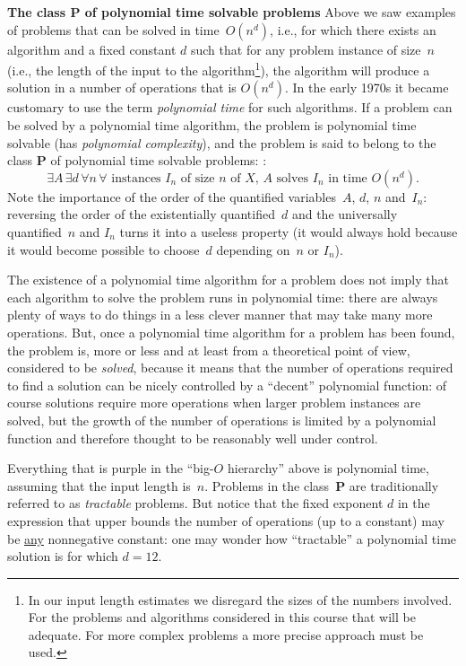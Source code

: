 \documentclass[titlepage]{article}
\theoremstyle{definition}
\numberwithin{equation}{subsection}
\numberwithin{remark}{subsection}
\begin{document}
\par\noindent
{\bf{The class {\bf P} of polynomial time solvable problems}}
Above we saw examples of problems that can be solved in time~$O(n^d)$, i.e., for which there exists an algorithm and a fixed constant $d$ such that for any problem instance of size~$n$ (i.e., the length of the input to the algorithm\footnote{In our input length estimates we disregard the sizes of the numbers involved. For the problems and algorithms considered in this course that will be adequate. For more complex problems a more precise approach must be used.}), the algorithm will produce a solution in a number of operations that is $O(n^d)$.
In the early 1970s it became customary to use the term \emph{polynomial time} for such algorithms.
If a problem can be solved by a polynomial time algorithm, the problem is polynomial time solvable (has \emph{polynomial complexity}), and the problem is said to belong to the class {\bf P} of polynomial time solvable problems:
{\color{red}{a problem~$X$ can be solved in polynomial time if there is an algorithm~$A$ and a fixed constant $d$ such that for all $n$ any instance of size~$n$ of problem~$X$ can be solved by~$A$ in $O(n^d)$ operations}}:
$$\exists A\,\exists d\,\forall n\,\forall {\text{ instances $I_n$ of size $n$ of $X$, $A$ solves $I_n$ in time $O(n^d)$}}. $$
Note the importance of the order of the quantified variables~$A$, $d$, $n$ and~$I_n$: reversing the order of the existentially quantified~$d$ and the universally quantified~$n$ and $I_n$ turns it into a useless property (it would always hold because it would become possible to choose~$d$ depending on~$n$ or $I_n$).

The existence of a polynomial time algorithm for a problem does not imply that each algorithm to solve the problem runs in polynomial time:
there are always plenty of ways to do things in a less clever manner that may take many more operations.
But, once a polynomial time algorithm for a problem has been found, the problem is, more or less and at least from a theoretical point of view, considered to be \emph{solved}, because it means that the number of operations required to find a solution can be nicely controlled by a ``decent'' polynomial function: of course solutions require more operations when larger problem instances are solved, but the growth of the number of operations is limited by a polynomial function and therefore thought to be reasonably well under control.

Everything that is purple in the ``big-$O$ hierarchy'' above is polynomial time, assuming that the input length is~$n$.
Problems in the class~{\bf P} are traditionally referred to as \emph{tractable} problems.
But notice that the fixed exponent $d$ in the expression that upper bounds the number of operations (up to a constant) may be \underline{any} nonnegative constant: one may wonder how ``tractable'' a polynomial time solution is for which $d=12$.
\end{document}
